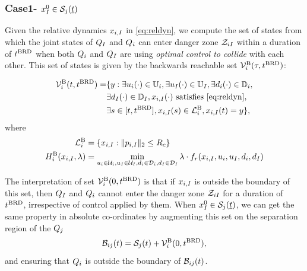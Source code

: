 \subsubsection{Case1- $x_{I}^0 \in \mathcal{S}_j(\underline{t})$} \label{sec:buffCase1}
Given the relative dynamics $x_{i, I}$ in \eqref{eq:reldyn}, we compute the set of states from which the joint states of $Q_{I}$ and $Q_{i}$ can enter danger zone $\mathcal{Z}_{iI}$ within a duration of $t^\text{BRD}$ when both $Q_{i}$ and $Q_{I}$ are using \textit{optimal control to collide} with each other. This set of states is given by the backwards reachable set $\mathcal{V}^{\text{B}}_i(\tau, t^\text{BRD})$:

\begin{equation} \label{eqn:buffBRS}
\begin{aligned}
\brs^{\text{B}}_{i}(t, \brd) = & \{y: \exists \ctrl_i(\cdot) \in \cfset_i, \exists \ctrl_\intr(\cdot) \in \cfset_\intr, \exists \dstb_i(\cdot) \in \dfset_i, \\
& \exists \dstb_\intr(\cdot) \in \dfset_\intr, \state_{i, \intr}(\cdot) \text{ satisfies \eqref{eq:reldyn}},\\
& \exists s \in [t, \brd], \state_{i, \intr}(s) \in \targetset^{\text{B}}_{i}, \state_{i, \intr}(t) = y\},
\end{aligned}
\end{equation}
where 
\begin{equation}
\begin{aligned}
\mathcal{L}^{\text{B}}_{i} &= \{x_{i, I}: \|p_{i, I}\|_2 \le R_c\} \\
H^{\text{B}}_{i}(x_{i, I}, \lambda) &= \min_{u_i \in \mathcal{U}_i, u_I \in \mathcal{U}_I, d_i \in \mathcal{D}_i, d_I \in \mathcal{D}_I} \lambda \cdot f_r(x_{i, I}, u_i, u_I, d_i, d_I)
\end{aligned}
\end{equation}

The interpretation of set $\mathcal{V}^{\text{B}}_{i}(0, t^\text{BRD})$ is that if $x_{i, I}$ is outside the boundary of this set, then $Q_{I}$ and $Q_{i}$ cannot enter the danger zone $\mathcal{Z}_{iI}$ for a duration of $t^\text{BRD}$, irrespective of control applied by them. When $x_{I}^0 \in \mathcal{S}_j(\underline{t})$, we can get the same property in absolute co-ordinates by augmenting this set on the separation region of the $Q_j$
\begin{equation} \label{eqn:buffRegion}
\buff_{ij}(t) = \sep_j(t) + \brs^{\text{B}}_{i}(0, \brd),
\end{equation} 
and ensuring that $Q_i$ is outside the boundary of $\mathcal{B}_{ij}(t)$.

